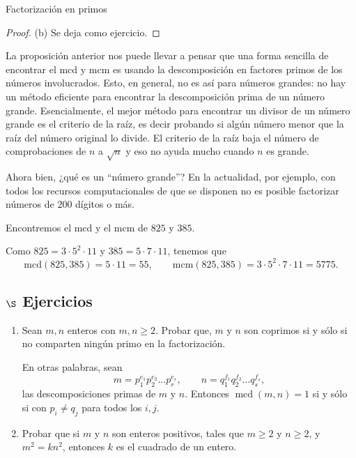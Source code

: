 \begin{section}{Factorización en primos}
\begin{proof}
\noindent(b) Se deja como ejercicio. 
\end{proof}


\begin{observacion} La proposición anterior nos puede llevar a pensar que una forma sencilla de encontrar el mcd y mcm  es usando la descomposición en factores primos de los números involucrados. Esto, en general, no es así para números grandes: no hay un método eficiente para encontrar la descomposición prima de un número grande. Esencialmente, el mejor método para encontrar un divisor de un número grande es el criterio de la raíz, es decir probando si algún número menor que la raíz del número original lo divide. El criterio de la raíz baja el número de comprobaciones de $n$ a $\sqrt{n}$ y eso no ayuda mucho cuando $n$ es grande.

 Ahora bien, ¿qué es un ``número grande''? En la actualidad, por ejemplo, con todos los recursos computacionales de que se disponen no es posible factorizar números de $200$ dígitos o más.     
\end{observacion}


\begin{ejemplo}
Encontremos el mcd y el mcm  de $825$ y $385$.

Como $825 =  3\cdot 5^2\cdot 11$ y $385 = 5\cdot 7\cdot 11$, tenemos que
$$
\text{mcd}(825,385) = 5\cdot 11 = 55, \qquad \text{mcm}(825,385) = 3\cdot 5^2\cdot 7\cdot 11 = 5775.
$$
\end{ejemplo}


\subsection*{\Large $\S$ Ejercicios}
\begin{enumerate}[1)]
	\item Sean $m,n$ enteros con $m,n\ge 2$. Probar que,  $m$ y  $n$ son coprimos si y sólo si no comparten ningún primo en la factorización. 
	
	En otras palabras, sean  
	$$
	m=p_1^{e_1}p_2^{e_2}\ldots p_r^{e_r},\qquad
	n=q_1^{f_1}q_2^{f_2}\ldots q_s^{f_s},
	$$ 
	las descomposiciones primas de $m$ y $n$. Entonces  $\operatorname{mcd}(m,n) =1$ si y sólo si con $p_i \not= q_j$ para todos los $i,j$.  
	
\item Probar que si $m$ y $n$ son enteros positivos, tales que $m\ge 2$ y $n \ge 2$, y
$m^2 = kn^2$, entonces $k$ es el cuadrado de un entero.


\end{enumerate}
\end{section}
